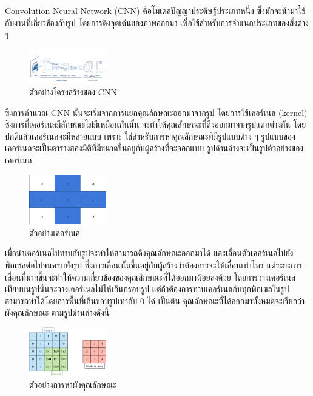 Convolution Neural Network (CNN) คือโมเดลปัญญาประดิษฐ์ประเภทหนึ่ง ซึ่งมักจะนำมาใช้กับงานที่เกี่ยวข้องกับรูป โดยการดึงจุดเด่นของภาพออกมา เพื่อใช้สำหรับการจำแนกประเภทของสิ่งต่าง ๆ

\begin{figure}[!ht]
	\centering
	\includegraphics[width=0.3\textwidth]{chapter2/images/CNN.png}
		\caption{ตัวอย่างโครงสร้างของ CNN}
    	\label{fig:CNN architecture}
\end{figure}

ซึ่งการคำนวณ CNN นั้นจะเริ่มจากการแยกคุณลักษณะออกมาจากรูป โดยการใช้เคอร์เนล (kernel) ซึ่งการที่เคอร์เนลมีลักษณะไม่มีเหมือนกันนั้น จะทำให้คุณลักษณะที่ดึงออกมาจากรูปแตกต่างกัน โดยปกติแล้วเคอร์เนลจะมีหลายแบบ เพราะ ใช่สำหรับการหาคุณลักษณะที่มีรูปแบบต่าง ๆ รูปแบบของเคอร์เนลจะเป็นตารางสองมิติที่มีขนาดขึ้นอยู่กับผู้สร้างที่จะออกแบบ รูปด้านล่างจะเป็นรูปตัวอย่างของเคอร์เนล

 \begin{figure}[!ht]
	\centering
	\includegraphics[width=0.3\textwidth]{chapter2/images/kernel_3x3.png}
		\caption{ตัวอย่างเคอร์เนล }
    	\label{fig:CNN architecture}
\end{figure}

เมื่อนำเคอร์เนลไปทาบกับรูปจะทำให้สามารถดึงคุณลักษณะออกมาได้ และเลื่อนตัวเคอร์เนลไปยังพิกเซลต่อไปจนครบทั้งรูป ซึ่งการเลื่อนนั้นขึ้นอยู่กับผู้สร้างว่าต้องการจะให้เลื่อนเท่าไหร แต่ระยะการเลื่อนที่มากขึ้นจะทำให้ความเกี่ยวข้องของคุณลักษณะที่ได้ออกมาน้อยลงด้วย โดยการวางเคอร์เนลเทียบบนรูปนั้นจะวางเคอร์เนลไม่ไห้เกินกรอบรูป แต่ถ้าต้องการทาบเคอร์เนลกับทุกพิกเซลในรูป สามารถทำได้โดยการพื้นที่เกินขอบรูปเท่ากับ 0 ได้ เป็นต้น คุณลักษณะที่ได้ออกมาทั้งหมดจะเรียกว่าผังคุณลักษณะ ตามรูปด่านล่างดังนี้

 \begin{figure}[!ht]
	\centering
	\includegraphics[width=0.3\textwidth]{chapter2/images/feature_map.png}
		\caption{ตัวอย่างการหาผังคุณลักษณะ }
    	\label{fig:example feature map}
\end{figure}

